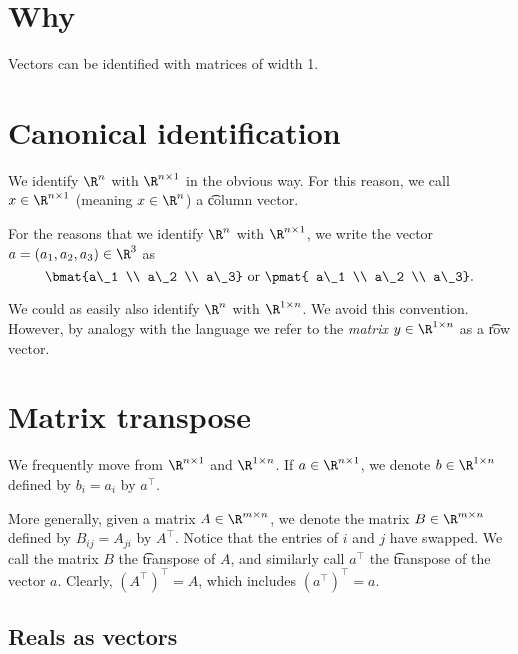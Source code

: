 
\section*{Why}

Vectors can be identified with matrices of width 1.

\section*{Canonical identification}

We identify $\R ^{n}$ with $\R ^{n \times  1}$ in the obvious way.
For this reason, we call $x \in \R ^{n \times  1}$ (meaning $x \in \R ^{n}$) a \t{column vector}.

For the reasons that we identify $\R ^n$ with $\R ^{n \times 1}$, we write the vector $a = (a_1, a_2, a_3) \in \R ^3$ as
  \[
\bmat{a\_1 \\ a\_2 \\ a\_3}
\text{ or }
\pmat{ a\_1 \\ a\_2 \\ a\_3}.
  \]

We could as easily also identify $\R ^{n}$ with $\R ^{1 \times n}$.
We avoid this convention.
However, by analogy with the language  we refer to the \textit{matrix} $y \in \R ^{1 \times  n}$ as a \t{row vector}.

\section*{Matrix transpose}

We frequently move from $\R ^{n \times  1}$ and $\R ^{1 \times n}$.
If $a \in \R ^{n \times  1}$, we denote $b \in \R ^{1 \times n}$ defined by $b_i = a_i$ by $a^\top $.

More generally, given a matrix $A \in \R ^{m \times  n}$, we denote the matrix $B \in \R ^{m \times  n}$ defined by $B_{ij} = A_{ji}$ by $A^\top $.
Notice that the entries of $i$ and $j$ have swapped.
We call the matrix $B$ the \t{transpose} of $A$, and similarly call $a^\top $ the \t{transpose} of the vector $a$.
Clearly, $(A^\top )^\top  = A$, which includes $(a^\top )^\top  = a$.

\subsection*{Reals as vectors}

